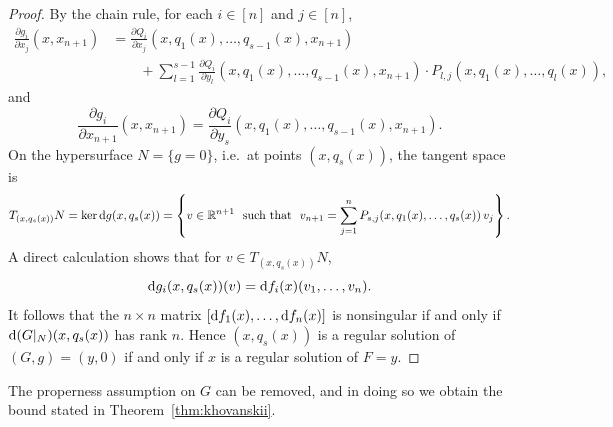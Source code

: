 \begin{proof}
By the chain rule, for each $i \in [n]$ and $j \in [n]$,
\begin{align*}
  \frac{\partial g_i}{\partial x_j}(x, x_{n+1}) &= \frac{\partial Q_i}{\partial x_j}(x, q_1(x), \ldots, q_{s-1}(x), x_{n+1}) \\
  &\qquad + \sum_{l=1}^{s-1} \frac{\partial Q_i}{\partial y_l}(x, q_1(x), \ldots, q_{s-1}(x), x_{n+1})\cdot P_{l,j}(x, q_1(x), \ldots, q_l(x)),
\end{align*}
and
\begin{equation*}
  \frac{\partial g_i}{\partial x_{n+1}}(x, x_{n+1}) = \frac{\partial Q_i}{\partial y_s}(x, q_1(x), \ldots, q_{s-1}(x), x_{n+1}).
\end{equation*}
On the hypersurface $N = \{g = 0\}$, i.e.\ at points $(x, q_s(x))$, the tangent space is
\begin{equation*}
  T_{(x, q_s(x))} N = \ker \mathrm{d}{g}(x, q_s(x)) = \left\{v \in \mathbb{R}^{n+1} \ \text{ such that }\  v_{n+1} = \sum_{j=1}^n P_{s,j}(x, q_1(x), \ldots, q_s(x))\, v_j\right\}.
\end{equation*}
A direct calculation shows that for $v \in T_{(x, q_s(x))} N$,
\begin{equation*}
  \mathrm{d}{g_i}(x, q_s(x))(v) = \mathrm{d}{f_i}(x)(v_1, \ldots, v_n).
\end{equation*}
It follows that the $n \times n$ matrix $[\mathrm{d}{f_1}(x), \ldots, \mathrm{d}{f_n}(x)]$ is nonsingular if and only if $\mathrm{d}{(G|_N)}(x, q_s(x))$ has rank $n$. Hence $(x, q_s(x))$ is a regular solution of $(G, g) = (y, 0)$ if and only if $x$ is a regular solution of $F = y$.
\end{proof}

\begin{claim} \label{claim:G-proper}
  The properness assumption on $G$ can be removed, and in doing so we obtain the bound stated in Theorem~\ref{thm:khovanskii}.
\end{claim}

